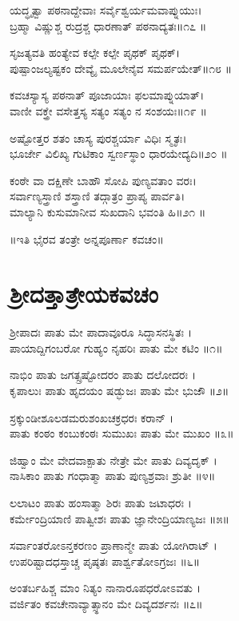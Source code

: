 ಯದ್ಧೃತ್ವಾ ಪಠನಾದ್ದೇವಾಃ ಸರ್ವೈಶ್ವರ್ಯಮವಾಪ್ನುಯುಃ।\\
ಬ್ರಹ್ಮಾ ವಿಷ್ಣುಶ್ಚ ರುದ್ರಶ್ಚ ಧಾರಣಾತ್ ಪಠನಾದ್ಯತಃ॥೧೭ ॥

ಸೃಜತ್ಯವತಿ ಹಂತ್ಯೇವ ಕಲ್ಪೇ ಕಲ್ಪೇ ಪೃಥಕ್ ಪೃಥಕ್।\\
ಪುಷ್ಪಾಂಜಲ್ಯಷ್ಟಕಂ ದೇವ್ಯೈ ಮೂಲೇನೈವ ಸಮರ್ಪಯೇತ್॥೧೮ ॥

ಕವಚಸ್ಯಾಸ್ಯ ಪಠನಾತ್ ಪೂಜಾಯಾಃ ಫಲಮಾಪ್ನುಯಾತ್।\\
ವಾಣೀ ವಕ್ತ್ರೇ ವಸೇತ್ತಸ್ಯ ಸತ್ಯಂ ಸತ್ಯಂ ನ ಸಂಶಯಃ॥೧೯ ॥

ಅಷ್ಟೋತ್ತರ ಶತಂ ಚಾಸ್ಯ ಪುರಶ್ಚರ್ಯಾ ವಿಧಿಃ ಸ್ಮೃತಃ।\\
ಭೂರ್ಜೇ ವಿಲಿಖ್ಯ ಗುಟಿಕಾಂ ಸ್ವರ್ಣಸ್ಥಾಂ ಧಾರಯೇದ್ಯದಿ॥೨೦ ॥

ಕಂಠೇ ವಾ ದಕ್ಷಿಣೇ ಬಾಹೌ ಸೋಪಿ ಪುಣ್ಯವತಾಂ ವರಃ।\\
ಸರ್ವಾಣ್ಯಸ್ತ್ರಾಣಿ ಶಸ್ತ್ರಾಣಿ ತದ್ಗಾತ್ರಂ ಪ್ರಾಪ್ಯ ಪಾರ್ವತಿ।\\
ಮಾಲ್ಯಾನಿ ಕುಸುಮಾನೀವ ಸುಖದಾನಿ ಭವಂತಿ ಹಿ॥೨೧ ॥
\begin{center}{\Large॥ಇತಿ ಭೈರವ ತಂತ್ರೇ ಅನ್ನಪೂರ್ಣಾ ಕವಚಂ॥}\end{center}

\section{ಶ್ರೀದತ್ತಾತ್ರೇಯಕವಚಂ}
ಶ್ರೀಪಾದಃ ಪಾತು ಮೇ ಪಾದಾವೂರೂ ಸಿದ್ಧಾಸನಸ್ಥಿತಃ ।\\
ಪಾಯಾದ್ದಿಗಂಬರೋ ಗುಹ್ಯಂ ನೃಹರಿಃ ಪಾತು ಮೇ ಕಟಿಂ ॥೧॥

ನಾಭಿಂ ಪಾತು ಜಗತ್ಸ್ರಷ್ಟೋದರಂ ಪಾತು ದಲೋದರಃ ।\\
ಕೃಪಾಲುಃ ಪಾತು ಹೃದಯಂ ಷಡ್ಭುಜಃ ಪಾತು ಮೇ ಭುಜೌ ॥೨॥

ಸ್ರಕ್ಕುಂಡೀಶೂಲಡಮರುಶಂಖಚಕ್ರಧರಃ ಕರಾನ್ ।\\
ಪಾತು ಕಂಠಂ ಕಂಬುಕಂಠಃ ಸುಮುಖಃ ಪಾತು ಮೇ ಮುಖಂ ॥೩॥

ಜಿಹ್ವಾಂ ಮೇ ವೇದವಾಕ್ಪಾತು ನೇತ್ರೇ ಮೇ ಪಾತು ದಿವ್ಯದೃಕ್ ।\\
ನಾಸಿಕಾಂ ಪಾತು ಗಂಧಾತ್ಮಾ ಪಾತು ಪುಣ್ಯಶ್ರವಾಃ ಶ್ರುತೀ ॥೪॥

ಲಲಾಟಂ ಪಾತು ಹಂಸಾತ್ಮಾ ಶಿರಃ ಪಾತು ಜಟಾಧರಃ ।\\
ಕರ್ಮೇಂದ್ರಿಯಾಣಿ ಪಾತ್ವೀಶಃ ಪಾತು ಜ್ಞಾನೇಂದ್ರಿಯಾಣ್ಯಜಃ ॥೫॥

ಸರ್ವಾಂತರೋಽನ್ತಕರಣಂ ಪ್ರಾಣಾನ್ಮೇ ಪಾತು ಯೋಗಿರಾಟ್ ।\\
ಉಪರಿಷ್ಟಾದಧಸ್ತಾಚ್ಚ ಪೃಷ್ಠತಃ ಪಾರ್ಶ್ವತೋಽಗ್ರಜಃ ॥೬॥

ಅಂತರ್ಬಹಿಶ್ಚ ಮಾಂ ನಿತ್ಯಂ ನಾನಾರೂಪಧರೋಽವತು ।\\
ವರ್ಜಿತಂ ಕವಚೇನಾವ್ಯಾತ್ಸ್ಥಾನಂ ಮೇ ದಿವ್ಯದರ್ಶನಃ ॥೭॥

